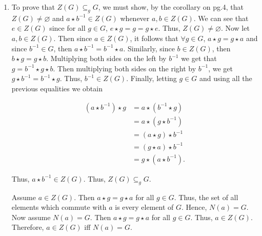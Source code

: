 \documentclass[12pt]{article}
\makeatletter
\theoremstyle{definition}
\theoremstyle{remark}
\renewenvironment{proof}[1][\proofname]{\par
  \pushQED{\qed}%
  \normalfont \topsep6\p@\@plus6\p@\relax
  \list{}{\leftmargin=0mm
          \rightmargin=4mm
          \settowidth{\itemindent}{\itshape#1}%
          \labelwidth=\itemindent
          \parsep=0pt \listparindent=\parindent 
  }
  \item[\hskip\labelsep
        \itshape
    #1\@addpunct{.}]\ignorespaces
}{%
  \popQED\endlist\@endpefalse
}
\let\oldproofname=\proofname
\renewcommand{\proofname}{\bf{\textit{\oldproofname}}}
\makeatother
\begin{document}
\begin{enumerate}[leftmargin=*]
        \begin{proof}
        
            To prove that $Z(G)\subseteq_g G$, we must show, by the corollary on pg.4, that $Z(G)\neq\varnothing$ and $a\star b^{-1}\in Z(G)$ whenever $a,b\in Z(G)$. We can see that $e\in Z(G)$ since for all $g\in G$, $e\star g=g=g\star e$. Thus, $Z(G)\neq\varnothing$. Now let $a,b\in Z(G)$. Then since $a\in Z(G)$, it follows that $\forall g\in G$, $a\star g=g\star a$ and since $b^{-1}\in G$, then $a\star b^{-1}=b^{-1}\star a$. Similarly, since $b\in Z(G)$, then $b\star g=g\star b$. Multiplying both sides on the left by $b^{-1}$ we get that $g=b^{-1}\star g\star b$. Then multiplying both sides on the right by $b^{-1}$, we get $g\star b^{-1}=b^{-1}\star g$. Thus, $b^{-1}\in Z(G)$. Finally, letting $g\in G$ and using all the previous equalities we obtain
            
            \begin{equation*}
                \begin{split}
                    (a\star b^{-1})\star g&=a\star(b^{-1}\star g) \\
                    &= a\star(g\star b^{-1}) \\
                    &= (a\star g)\star b^{-1} \\
                    &= (g\star a)\star b^{-1} \\
                    &= g\star (a\star b^{-1}).
                \end{split}
            \end{equation*}
        
            Thus, $a\star b^{-1}\in Z(G)$. Thus, $Z(G)\subseteq_g G$.\par\hspace{4mm} Assume $a\in Z(G)$. Then $a\star g=g\star a$ for all $g\in G$. Thus, the set of all elements which commute with $a$ is every element of $G$. Hence, $N(a)=G$. Now assume $N(a)=G$. Then $a\star g=g\star a$ for all $g\in G$. Thus, $a\in Z(G)$. Therefore, $a\in Z(G)$ iff $N(a)=G$.
        \end{proof}
        

\end{enumerate}
\end{document}
